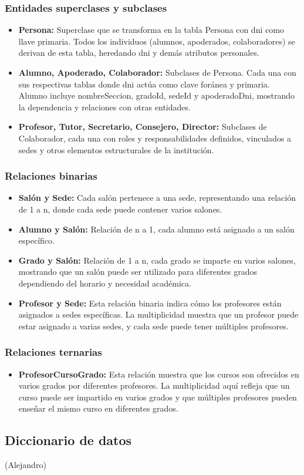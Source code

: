 \subsubsection{Entidades superclases y subclases}
\begin{itemize}
	\item \textbf{Persona:} Superclase que se transforma en la tabla Persona con dni como llave primaria. Todos los individuos (alumnos, apoderados, colaboradores) se derivan de esta tabla, heredando dni y demás atributos personales.
	\item \textbf{Alumno, Apoderado, Colaborador:} Subclases de Persona. Cada una con sus respectivas tablas donde dni actúa como clave foránea y primaria. Alumno incluye nombreSeccion, gradoId, sedeId y apoderadoDni, mostrando la dependencia y relaciones con otras entidades.
	\item \textbf{Profesor, Tutor, Secretario, Consejero, Director:} Subclases de Colaborador, cada una con roles y responsabilidades definidos, vinculados a sedes y otros elementos estructurales de la institución.
\end{itemize}
\subsubsection{Relaciones binarias}
\begin{itemize}
	\item \textbf{Salón y Sede:} Cada salón pertenece a una sede, representando una relación de 1 a n, donde cada sede puede contener varios salones.
	\item \textbf{Alumno y Salón:} Relación de n a 1, cada alumno está asignado a un salón específico.
	\item \textbf{Grado y Salón:} Relación de 1 a n, cada grado se imparte en varios salones, mostrando que un salón puede ser utilizado para diferentes grados dependiendo del horario y necesidad académica.
	\item \textbf{Profesor y Sede:} Esta relación binaria indica cómo los profesores están asignados a sedes específicas. La multiplicidad muestra que un profesor puede estar asignado a varias sedes, y cada sede puede tener múltiples profesores.
\end{itemize}
\subsubsection{Relaciones ternarias}
\begin{itemize}
	\item \textbf{ProfesorCursoGrado:} Esta relación muestra que los cursos son ofrecidos en varios grados por diferentes profesores. La multiplicidad aquí refleja que un curso puede ser impartido en varios grados y que múltiples profesores pueden enseñar el mismo curso en diferentes grados.
\end{itemize}
\subsection{Diccionario de datos} (Alejandro)
